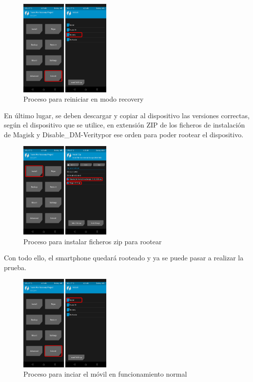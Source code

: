 \documentclass[12pt,a4paper,onecolumn,oneside]{report}
\begin{document}
\begin{figure}[!h] 
\centering
  \includegraphics[width=0.4\textwidth]{figuras/root53.png}
  \caption[Proceso para reiniciar en modo recovery]{Proceso para reiniciar en modo recovery\\
  }
  \label{fig:root53}
\end{figure}


En último lugar, se deben descargar y copiar al dispositivo las versiones correctas, según el dispositivo que se utilice, en extensión ZIP de los ficheros de instalación de Magisk y Disable\_DM-Veritypor ese orden  para poder rootear el dispositivo.

\begin{figure}[H] 
\centering
  \includegraphics[width=0.4\textwidth]{figuras/root54.png}
  \caption[Proceso para instalar ficheros zip para rootear]{Proceso para instalar ficheros zip para rootear\\
  }
  \label{fig:root54}
\end{figure}

Con todo ello, el smartphone quedará rooteado y ya se puede pasar a realizar la prueba.

\begin{figure}[H] 
\centering
  \includegraphics[width=0.4\textwidth]{figuras/root55.png}
  \caption[Proceso para inciar el móvil en funcionamiento normal]{Proceso para inciar el móvil en funcionamiento normal\\
  }
  \label{fig:root55}
\end{figure}
\end{document}

